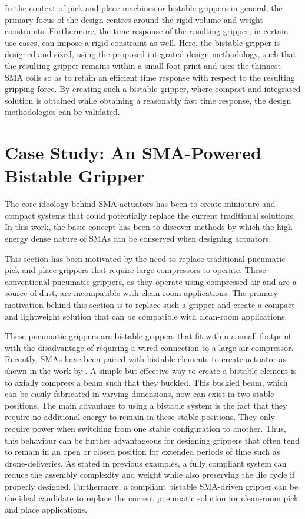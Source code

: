 In the context of pick and place machines or bistable grippers in general, the primary focus of the design centres around the rigid volume and weight constraints. Furthermore, the time response of the resulting gripper, in certain use cases, can impose a rigid constraint as well. Here, the bistable gripper is designed and sized, using the proposed integrated design methodology, such that the resulting gripper remains within a small foot print and uses the thinnest SMA coils so as to retain an efficient time response with respect to the resulting gripping force. By creating such a bistable gripper, where compact and integrated solution is obtained while obtaining a reasonably fast time response, the design methodologies can be validated.

\section{Case Study: An SMA-Powered Bistable Gripper}\label{sec:smabb-gripper}
The core ideology behind SMA actuators has been to create miniature and compact systems that could potentially replace the current traditional solutions. In this work, the basic concept has been to discover methods by which the high energy dense nature of SMAs can be conserved when designing actuators.

This section has been motivated by the need to replace traditional pneumatic pick and place grippers that require large compressors to operate. These conventional pneumatic grippers, as they operate using compressed air and are a source of dust, are incompatible with clean-room applications. The primary motivation behind this section is to replace such a gripper and create a compact and lightweight solution that can be compatible with clean-room applications.

These pneumatic grippers are bistable grippers that fit within a small footprint with the disadvantage of requiring a wired connection to a large air compressor. Recently, SMAs have been paired with bistable elements to create actuator as shown in the work by \todocite. A simple but effective way to create a bistable element is to axially compress a beam such that they buckled. This buckled beam, which can be easily fabricated in varying dimensions, now can exist in two stable positions. The main advantage to using a bistable system is the fact that they require no additional energy to remain in these stable positions. They only require power when switching from one stable configuration to another. Thus, this behaviour can be further advantageous for designing grippers that often tend to remain in an open or closed position for extended periods of time such as drone-deliveries. As stated in previous examples, a fully compliant system can reduce the assembly complexity and weight while also preserving the life cycle if properly designed. Furthermore, a compliant bistable SMA-driven gripper can be the ideal candidate to replace the current pneumatic solution for clean-room pick and place applications.
